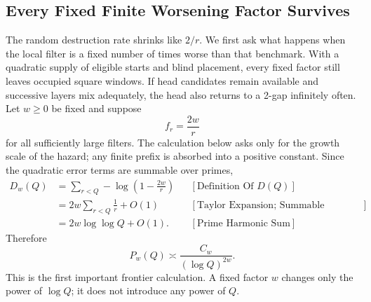 \subsection{Every Fixed Finite Worsening Factor Survives}
The random destruction rate shrinks like $2/r$. We first ask what happens when the local filter is a fixed number of times worse than that benchmark. With a quadratic supply of eligible starts and blind placement, every fixed factor still leaves occupied square windows. If head candidates remain available and successive layers mix adequately, the head also returns to a 2-gap infinitely often.
Let $w\ge 0$ be fixed and suppose
\begin{equation*}
f_r=\frac{2w}{r}
\end{equation*}
for all sufficiently large filters. The calculation below asks only for the growth scale of the hazard; any finite prefix is absorbed into a positive constant. Since the quadratic error terms are summable over primes,
\begin{equation*}
\begin{aligned}
D_w(Q)
&=\sum_{r < Q}-\log\left(1-\frac{2w}{r}\right)
&&[\text{Definition Of }D(Q)]\\
&=2w\sum_{r < Q}\frac1r+O(1)
&&[\text{Taylor Expansion; Summable Remainder}]\\
&=2w\log\log Q+O(1).
&&[\text{Prime Harmonic Sum}]
\end{aligned}
\end{equation*}
Therefore
\begin{equation*}
P_w(Q)\asymp\frac{C_w}{(\log Q)^{2w}}.
\end{equation*}
This is the first important frontier calculation. A fixed factor $w$ changes only the power of $\log Q$; it does not introduce any power of $Q$.

